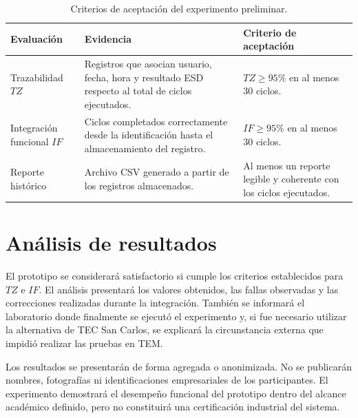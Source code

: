 \begin{table}[H]
\centering
\caption{Criterios de aceptación del experimento preliminar.}
\label{tab:criterios_validacion}
\begin{tabularx}{\textwidth}{>{\raggedright\arraybackslash}p{3.4cm}
                            >{\raggedright\arraybackslash}X
                            >{\raggedright\arraybackslash}p{3.5cm}}
\toprule
\textbf{Evaluación} &
\textbf{Evidencia} &
\textbf{Criterio de aceptación} \\
\midrule
Trazabilidad \(TZ\) &
Registros que asocian usuario, fecha, hora y resultado ESD respecto al total de
ciclos ejecutados. &
\(TZ \geq 95\%\) en al menos 30 ciclos. \\
\addlinespace
Integración funcional \(IF\) &
Ciclos completados correctamente desde la identificación hasta el
almacenamiento del registro. &
\(IF \geq 95\%\) en al menos 30 ciclos. \\
\addlinespace
Reporte histórico &
Archivo CSV generado a partir de los registros almacenados. &
Al menos un reporte legible y coherente con los ciclos ejecutados. \\
\bottomrule
\end{tabularx}
\end{table}

\section{Análisis de resultados}

El prototipo se considerará satisfactorio si cumple los criterios establecidos para \(TZ\) e \(IF\).
El análisis presentará los valores obtenidos, las fallas observadas y las
correcciones realizadas durante la integración. También se informará el
laboratorio donde finalmente se ejecutó el experimento y, si fue necesario
utilizar la alternativa de TEC San Carlos, se explicará la circunstancia externa
que impidió realizar las pruebas en TEM.

Los resultados se presentarán de forma agregada o anonimizada. No se publicarán
nombres, fotografías ni identificaciones empresariales de los participantes. El
experimento demostrará el desempeño funcional del prototipo dentro del alcance
académico definido, pero no constituirá una certificación industrial del
sistema.
